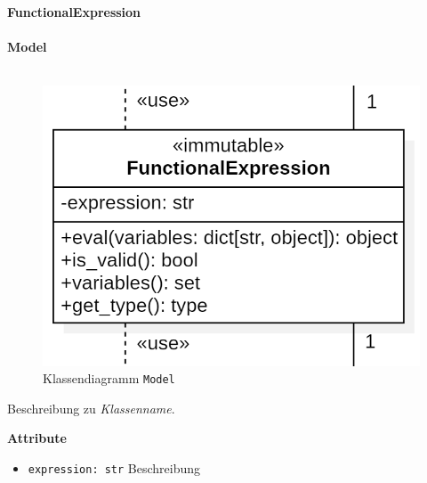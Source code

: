 \documentclass{article}
\begin{document}
\newpage
\textbf{\large{FunctionalExpression}}\\\\
\textbf{\large{Model}}\\\\
\begin{figure}[H]%
    \centering
    \includegraphics[width=13cm]{entwurf/Entwurf_dokument/img/cls/model/FunctionalExpression.png}
    \caption{Klassendiagramm \texttt{Model}}
\end{figure}

Beschreibung zu \textit{Klassenname}.
\newline \newline

\textbf{{Attribute}}
\begin{itemize}
\item \texttt{expression: str} \newline Beschreibung
\\\\
\end{itemize}
\end{document}
